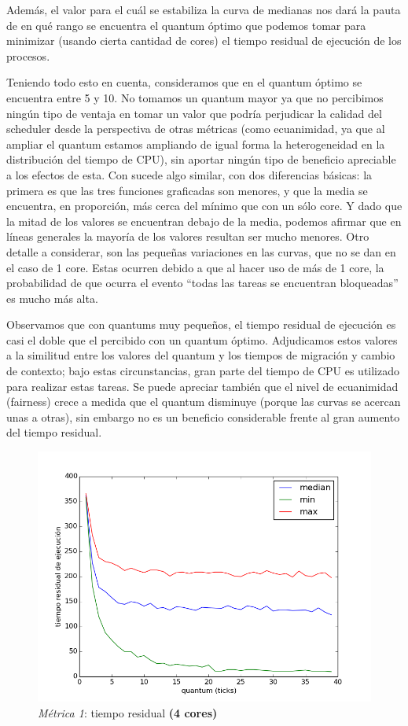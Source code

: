 \documentclass[11pt, a4paper, twoside]{article}
\begin{document}
Además, el valor para el cuál se estabiliza la curva de medianas nos dará la pauta de en qué rango se encuentra
el quantum  óptimo que podemos tomar para minimizar (usando cierta cantidad de cores) el tiempo residual 
de ejecución de los procesos. 

Teniendo todo esto en cuenta, consideramos que en  el quantum óptimo se encuentra entre 5 y 10.
No tomamos un quantum mayor ya que no percibimos ningún tipo de ventaja en tomar un valor que podría
perjudicar la calidad del scheduler desde la perspectiva de otras métricas (como ecuanimidad, ya que al 
ampliar el quantum estamos ampliando de igual forma la heterogeneidad en la distribución del tiempo de CPU),
sin aportar ningún tipo de beneficio apreciable a los efectos de esta.
Con  sucede algo similar, con dos diferencias básicas: la primera es que las tres funciones
graficadas son menores, y que la media se encuentra, en proporción, más cerca del
mínimo que con un sólo core. Y dado que la mitad de los valores se encuentran debajo de la media, podemos
afirmar que en líneas generales la mayoría de los valores resultan ser mucho menores. Otro detalle
a considerar, son las pequeñas variaciones en las curvas, que no se dan en el caso de 1 core. Estas ocurren
debido a que al hacer uso de más de 1 core, la probabilidad de que ocurra el evento ``todas las tareas
se encuentran bloqueadas'' es mucho más alta.

Observamos que con quantums muy pequeños, el tiempo residual de ejecución es casi el doble que el percibido
con un quantum óptimo. Adjudicamos estos valores a la similitud entre los valores del quantum y los tiempos 
de migración y cambio de contexto; bajo estas circunstancias, gran parte del tiempo de CPU es utilizado para
realizar estas tareas. Se puede apreciar también que el nivel de ecuanimidad (fairness) crece a medida que 
el quantum disminuye (porque las curvas se acercan unas a otras), sin embargo no es un beneficio 
considerable frente al gran aumento del tiempo residual. 

\begin{figure}[H]
  \centering
  \includegraphics [width=\textwidth]{../graficos/metrica_eze_plot_batch_4core.png}
  \caption{\emph{Métrica 1}: tiempo residual \textbf{(4 cores)}}
  \label{fig:eze-4core}
\end{figure}
\end{document}
